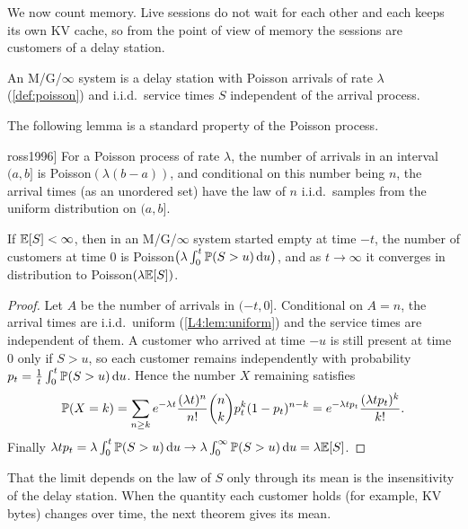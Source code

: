 We now count memory. Live sessions do not wait for each other and each keeps its
own KV cache, so from the point of view of memory the sessions are customers of a
delay station.

\begin{definition}[M/G/$\infty$]\label{L4:def:mginf}
An M/G/$\infty$ system is a delay station with Poisson arrivals of rate $\lambda$
(\cref{def:poisson}) and i.i.d.\ service times $S$ independent of the arrival
process.
\end{definition}

The following lemma is a standard property of the Poisson process.

\begin{lemma}[Conditional uniformity \cite[\S2.3]{ross1996}]\label{L4:lem:uniform}
For a Poisson process of rate $\lambda$, the number of arrivals in an interval
$(a,b]$ is Poisson$(\lambda(b-a))$, and conditional on this number being $n$, the
arrival times (as an unordered set) have the law of $n$ i.i.d.\ samples from the
uniform distribution on $(a,b]$.
\end{lemma}

\begin{proposition}\label{L4:prop:mginf}
If $\mathbb{E}[S]<\infty$, then in an M/G/$\infty$ system started empty at time $-t$, the
number of customers at time $0$ is
Poisson$\bigl(\lambda\int_0^t\mathbb{P}(S>u)\,\mathrm{d} u\bigr)$, and as $t\to\infty$ it
converges in distribution to Poisson$(\lambda\mathbb{E}[S])$.
\end{proposition}

\begin{proof}
Let $A$ be the number of arrivals in $(-t,0]$. Conditional on $A=n$, the arrival
times are i.i.d.\ uniform (\cref{L4:lem:uniform}) and the service times are
independent of them. A customer who arrived at time $-u$ is still present at time
$0$ only if $S>u$, so each customer remains independently with probability
$p_t=\frac1t\int_0^t\mathbb{P}(S>u)\,\mathrm{d} u$. Hence the number $X$ remaining satisfies
\[
  \mathbb{P}(X=k)=\sum_{n\ge k}e^{-\lambda t}\frac{(\lambda t)^n}{n!}\binom nk p_t^k(1-p_t)^{n-k}
  =e^{-\lambda tp_t}\frac{(\lambda tp_t)^k}{k!} .
\]
Finally $\lambda tp_t=\lambda\int_0^t\mathbb{P}(S>u)\,\mathrm{d} u\to\lambda\int_0^\infty\mathbb{P}(S>u)\,\mathrm{d} u=\lambda\mathbb{E}[S]$.
\end{proof}

That the limit depends on the law of $S$ only through its mean is the
insensitivity of the delay station. When the quantity each customer holds (for
example, KV bytes) changes over time, the next theorem gives its mean.

